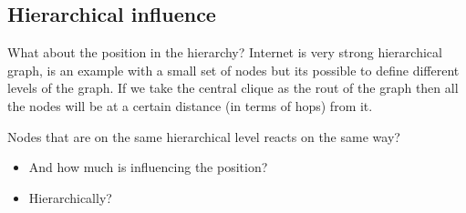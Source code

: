 \subsection{Hierarchical influence}
\label{subsec:hierarchical_influence}

What about the position in the hierarchy?
Internet is very strong hierarchical graph, 
is an example with a small set of nodes but its possible to define different levels
of the graph.
If we take the central clique as the rout of the graph then all the nodes will
be at a certain distance (in terms of hops) from it.

Nodes that are on the same hierarchical level reacts on the same way? 

\begin{itemize}
    \item And how much is influencing the position?
    \item Hierarchically?
\end{itemize}
